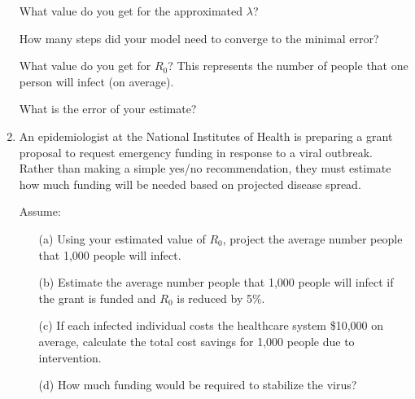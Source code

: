 \documentclass[11pt]{article}
\begin{document}
\begin{enumerate}
{  \task  What value do you get for the approximated $\lambda$? 
  
    
\task How many steps did your model need to converge to the minimal error?
    
   \task  What value do you get for $R_0$? This represents the number of people that one person will infect (on average).
    \vspace{3cm}
    
    \task What is the error of your estimate?
    \vspace{3cm}

}




    
\newpage
\item An epidemiologist at the National Institutes of Health is preparing a grant proposal to request emergency funding in response to a viral outbreak. Rather than making a simple yes/no recommendation, they must estimate how much funding will be needed based on projected disease spread.


Assume:


\begin{enumerate}
    \item[(a)]  Using your estimated value of $R_0$, project the average number people that 1{,}000 people will infect.
        \vspace{3cm}
    \item[(b)]  Estimate the average number people that 1{,}000 people will infect if the grant is funded and $R_0$ is reduced by 5\%.
        \vspace{3cm}
    \item[(c)]  If each infected individual costs the healthcare system \$10{,}000 on average, calculate the total cost savings  for 1{,}000 people due to intervention.
        \vspace{3cm}
    \item[(d)] How much funding would be required to stabilize the virus?
        \vspace{3cm}

\end{enumerate}

\end{enumerate}
\end{document}
